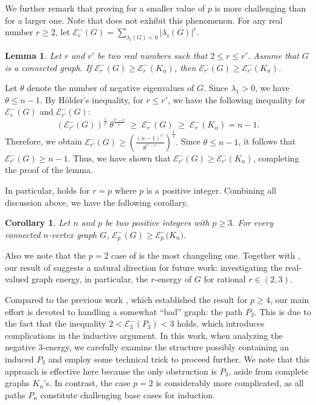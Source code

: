 \documentclass[a4paper,12pt]{article}
\theoremstyle{plain}
\newtheorem{lemma}[thm]{Lemma}
\newtheorem{corollary}[thm]{Corollary}
\begin{document}
We further remark that proving  for a smaller value of $p$ is more challenging than for a larger one. Note that  does not exhibit this phenomenon. For any real number $r\geq 2$, let $\mathcal{E}^-_r(G)=\sum\limits_{\lambda_{i}(G)<0}|\lambda_{i}(G)|^{r}$.

\begin{lemma}\label{lem:r to r'}
Let $r$ and $r'$ be two real numbers such that $2\leq r\leq r'$.  Assume that $G$ is a connected graph. 
If $\mathcal{E}_r^-(G)\geq\mathcal{E}_r^-(K_n)$, then $\mathcal{E}_{r'}^-(G)\geq\mathcal{E}_{r'}^-(K_n)$.
\end{lemma}

Let $\theta$ denote the number of negative eigenvalues of $G$. Since $\lambda_1 >0$, we have $\theta \leq n-1$. By Hölder's inequality, for $r \leq r'$, we have the following inequality for $\mathcal{E}_r^-(G)$ and $\mathcal{E}_{r'}^-(G)$: $$(\mathcal{E}_{r'}^-(G))^{\frac{r}{r'}} \, \theta^{\frac{r'-r}{r'}} \;\geq\; \mathcal{E}_r^-(G) \;\geq\; \mathcal{E}_r^-(K_n) = n-1.$$ Therefore, we obtain $\mathcal{E}_{r'}^-(G) \geq (\frac{(n-1)^{r'}}{\theta^{r'-r}})^{\frac{1}{r}}.$ Since $\theta \leq n-1$, it follows that $\mathcal{E}_{r'}^-(G) \geq n-1.$ Thus, we have shown that $\mathcal{E}_{r'}^-(G) \geq \mathcal{E}_{r'}^-(K_n)$, completing the proof of the lemma.

\medskip
In particular,  holds for $r=p$ where $p$ is a positive integer. Combining all discussion above, we have the following corollary.


\begin{corollary}
Let $n$ and $p$ be two positive integers with $p\geq 3$. For every connected $n$-vertex graph $G$, $\mathcal{E}^-_p({G}) \geq \mathcal{E}^-_p({K_{n})}.$
\end{corollary}


Also we note that the $p=2$ case of  is the most changeling one. Together with , our result of  suggests a natural direction for future work: investigating the real-valued graph energy, in particular, the $r$-energy of $G$ for rational $r \in (2, 3)$. 

Compared to the previous work \cite{AKBARI202596}, which established the result for $p \geq 4$, our main effort is devoted to handling a somewhat ``bad'' graph: the path $P_3$. This is due to the fact that the inequality $2<\mathcal{E}_3^-(P_3)<3$ holds, which introduces complications in the inductive argument. In this work, when analyzing the negative $3$-energy, we carefully examine the structure possibly containing an induced $P_3$ and employ some technical trick to proceed further. We note that this approach is effective here because the only obstruction is $P_3$, aside from complete graphs $K_n$'s. In contrast, the case $p=2$ is considerably more complicated, as all paths $P_n$ constitute challenging base cases for induction.
\end{document}
